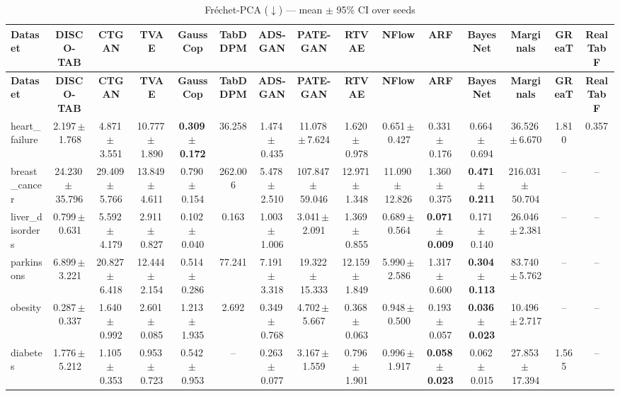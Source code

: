 \documentclass[8pt]{extarticle}
\begin{document}
\begin{longtable}{l*{14}{c}}
\caption{Fr\'echet-PCA ($\downarrow$) --- mean $\pm$ 95\% CI over seeds}\\
\toprule
\textbf{Dataset} & \textbf{DISCO-TAB} & \textbf{CTGAN} & \textbf{TVAE} & \textbf{GaussCop} & \textbf{TabDDPM} & \textbf{ADS-GAN} & \textbf{PATE-GAN} & \textbf{RTVAE} & \textbf{NFlow} & \textbf{ARF} & \textbf{BayesNet} & \textbf{Marginals} & \textbf{GReaT} & \textbf{RealTabF} \\
\midrule
\endfirsthead
\toprule
\textbf{Dataset} & \textbf{DISCO-TAB} & \textbf{CTGAN} & \textbf{TVAE} & \textbf{GaussCop} & \textbf{TabDDPM} & \textbf{ADS-GAN} & \textbf{PATE-GAN} & \textbf{RTVAE} & \textbf{NFlow} & \textbf{ARF} & \textbf{BayesNet} & \textbf{Marginals} & \textbf{GReaT} & \textbf{RealTabF} \\
\midrule
\endhead
\bottomrule
\endfoot
heart\_failure & 2.197\,$\pm$\,1.768 & 4.871\,$\pm$\,3.551 & 10.777\,$\pm$\,1.890 & \textbf{0.309\,$\pm$\,0.172} & 36.258 & 1.474\,$\pm$\,0.435 & 11.078\,$\pm$\,7.624 & 1.620\,$\pm$\,0.978 & 0.651\,$\pm$\,0.427 & 0.331\,$\pm$\,0.176 & 0.664\,$\pm$\,0.694 & 36.526\,$\pm$\,6.670 & 1.810 & 0.357 \\
breast\_cancer & 24.230\,$\pm$\,35.796 & 29.409\,$\pm$\,5.766 & 13.849\,$\pm$\,4.611 & 0.790\,$\pm$\,0.154 & 262.006 & 5.478\,$\pm$\,2.510 & 107.847\,$\pm$\,59.046 & 12.971\,$\pm$\,1.348 & 11.090\,$\pm$\,12.826 & 1.360\,$\pm$\,0.375 & \textbf{0.471\,$\pm$\,0.211} & 216.031\,$\pm$\,50.704 & -- & -- \\
liver\_disorders & 0.799\,$\pm$\,0.631 & 5.592\,$\pm$\,4.179 & 2.911\,$\pm$\,0.827 & 0.102\,$\pm$\,0.040 & 0.163 & 1.003\,$\pm$\,1.006 & 3.041\,$\pm$\,2.091 & 1.369\,$\pm$\,0.855 & 0.689\,$\pm$\,0.564 & \textbf{0.071\,$\pm$\,0.009} & 0.171\,$\pm$\,0.140 & 26.046\,$\pm$\,2.381 & -- & -- \\
parkinsons & 6.899\,$\pm$\,3.221 & 20.827\,$\pm$\,6.418 & 12.444\,$\pm$\,2.154 & 0.514\,$\pm$\,0.286 & 77.241 & 7.191\,$\pm$\,3.318 & 19.322\,$\pm$\,15.333 & 12.159\,$\pm$\,1.849 & 5.990\,$\pm$\,2.586 & 1.317\,$\pm$\,0.600 & \textbf{0.304\,$\pm$\,0.113} & 83.740\,$\pm$\,5.762 & -- & -- \\
obesity & 0.287\,$\pm$\,0.337 & 1.640\,$\pm$\,0.992 & 2.601\,$\pm$\,0.085 & 1.213\,$\pm$\,1.935 & 2.692 & 0.349\,$\pm$\,0.768 & 4.702\,$\pm$\,5.667 & 0.368\,$\pm$\,0.063 & 0.948\,$\pm$\,0.500 & 0.193\,$\pm$\,0.057 & \textbf{0.036\,$\pm$\,0.023} & 10.496\,$\pm$\,2.717 & -- & -- \\
diabetes & 1.776\,$\pm$\,5.212 & 1.105\,$\pm$\,0.353 & 0.953\,$\pm$\,0.723 & 0.542\,$\pm$\,0.953 & -- & 0.263\,$\pm$\,0.077 & 3.167\,$\pm$\,1.559 & 0.796\,$\pm$\,1.901 & 0.996\,$\pm$\,1.917 & \textbf{0.058\,$\pm$\,0.023} & 0.062\,$\pm$\,0.015 & 27.853\,$\pm$\,17.394 & 1.565 & -- \\

\end{longtable}
\end{document}
